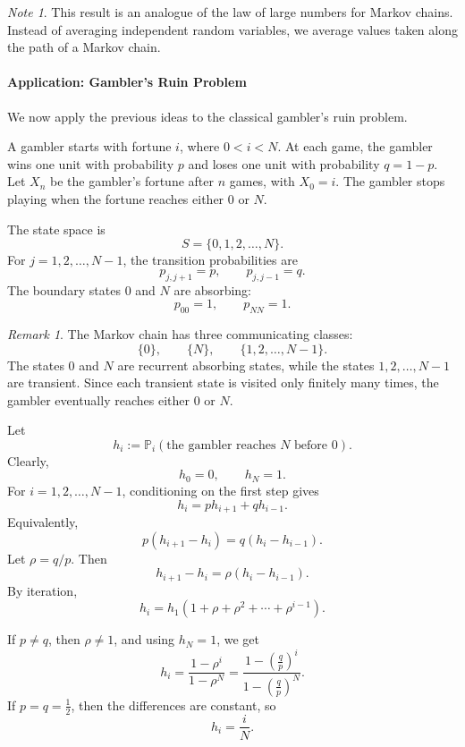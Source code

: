 \documentclass[11pt]{article}
\theoremstyle{plain}
\theoremstyle{definition}
\theoremstyle{remark}
\newtheorem{remark}[theorem]{Remark}
\newtheorem{note}[theorem]{Note}
\begin{document}
	\begin{note}
		This result is an analogue of the law of large numbers for Markov chains. Instead of averaging independent random variables, we average values taken along the path of a Markov chain.
	\end{note}
	
	
	
	\paragraph{Application: Gambler's Ruin Problem}
	
	We now apply the previous ideas to the classical gambler's ruin problem.
	
	A gambler starts with fortune \(i\), where \(0<i<N\). At each game, the gambler wins one unit with probability \(p\) and loses one unit with probability \(q=1-p\). Let \(X_n\) be the gambler's fortune after \(n\) games, with \(X_0=i\). The gambler stops playing when the fortune reaches either \(0\) or \(N\).
	
	The state space is
	\[
	S=\{0,1,2,\dots,N\}.
	\]
	For \(j=1,2,\dots,N-1\), the transition probabilities are
	\[
	p_{j,j+1}=p,
	\qquad
	p_{j,j-1}=q.
	\]
	The boundary states \(0\) and \(N\) are absorbing:
	\[
	p_{00}=1,
	\qquad
	p_{NN}=1.
	\]
	
	\begin{remark}
		The Markov chain has three communicating classes:
		\[
		\{0\},
		\qquad
		\{N\},
		\qquad
		\{1,2,\dots,N-1\}.
		\]
		The states \(0\) and \(N\) are recurrent absorbing states, while the states \(1,2,\dots,N-1\) are transient. Since each transient state is visited only finitely many times, the gambler eventually reaches either \(0\) or \(N\).
	\end{remark}
	
	
	
	
	
	Let
	\[
	h_i:=\mathbb{P}_i(\text{the gambler reaches }N\text{ before }0).
	\]
	Clearly,
	\[
	h_0=0,
	\qquad
	h_N=1.
	\]
	For \(i=1,2,\dots,N-1\), conditioning on the first step gives
	\[
	h_i=ph_{i+1}+qh_{i-1}.
	\]
	Equivalently,
	\[
	p(h_{i+1}-h_i)=q(h_i-h_{i-1}).
	\]
	Let \(\rho=q/p\). Then
	\[
	h_{i+1}-h_i=\rho(h_i-h_{i-1}).
	\]
	By iteration,
	\[
	h_i=h_1(1+\rho+\rho^2+\cdots+\rho^{i-1}).
	\]
	
	If \(p\neq q\), then \(\rho\neq 1\), and using \(h_N=1\), we get
	\[
	h_i=
	\frac{1-\rho^i}{1-\rho^N}
	=
	\frac{1-\left(\frac{q}{p}\right)^i}
	{1-\left(\frac{q}{p}\right)^N}.
	\]
	If \(p=q=\frac12\), then the differences are constant, so
	\[
	h_i=\frac{i}{N}.
	\]
	
\end{document}

